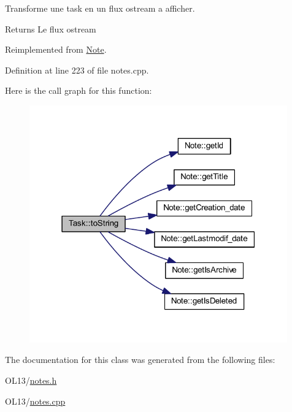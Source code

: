 Transforme une task en un flux ostream a afficher. 

\begin{DoxyReturn}{Returns}
Le flux ostream 
\end{DoxyReturn}


Reimplemented from \hyperlink{class_note_a1bd4acfbde0b71d05fd7d4ca889bca2b}{Note}.



Definition at line 223 of file notes.\+cpp.

Here is the call graph for this function\+:\nopagebreak
\begin{figure}[H]
\begin{center}
\leavevmode
\includegraphics[width=315pt]{class_task_a7fe5cb7b57a21693e7abfea2f9618563_cgraph}
\end{center}
\end{figure}


The documentation for this class was generated from the following files\+:\begin{DoxyCompactItemize}
\item 
O\+L13/\hyperlink{notes_8h}{notes.\+h}\item 
O\+L13/\hyperlink{notes_8cpp}{notes.\+cpp}\end{DoxyCompactItemize}

